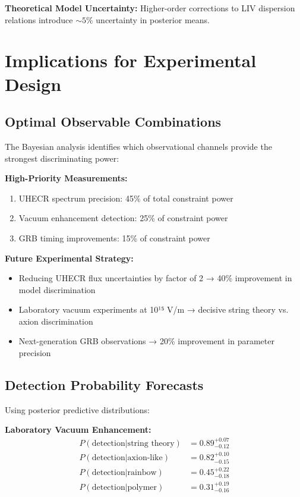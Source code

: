 \documentclass[12pt]{article}
\begin{document}
\textbf{Theoretical Model Uncertainty:}
Higher-order corrections to LIV dispersion relations introduce $\sim 5\%$ uncertainty in posterior means.

\section{Implications for Experimental Design}

\subsection{Optimal Observable Combinations}

The Bayesian analysis identifies which observational channels provide the strongest discriminating power:

\textbf{High-Priority Measurements:}
\begin{enumerate}
\item UHECR spectrum precision: 45\% of total constraint power
\item Vacuum enhancement detection: 25\% of constraint power
\item GRB timing improvements: 15\% of constraint power
\end{enumerate}

\textbf{Future Experimental Strategy:}
\begin{itemize}
\item Reducing UHECR flux uncertainties by factor of 2 → 40\% improvement in model discrimination
\item Laboratory vacuum experiments at 10¹⁵ V/m → decisive string theory vs. axion discrimination
\item Next-generation GRB observations → 20\% improvement in parameter precision
\end{itemize}

\subsection{Detection Probability Forecasts}

Using posterior predictive distributions:

\textbf{Laboratory Vacuum Enhancement:}
\begin{align}
P(\text{detection} | \text{string theory}) &= 0.89^{+0.07}_{-0.12} \\
P(\text{detection} | \text{axion-like}) &= 0.82^{+0.10}_{-0.15} \\
P(\text{detection} | \text{rainbow}) &= 0.45^{+0.22}_{-0.18} \\
P(\text{detection} | \text{polymer}) &= 0.31^{+0.19}_{-0.16}
\end{align}
\end{document}
